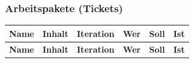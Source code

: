 \documentclass[a4,12pt]{scrartcl}
\begin{document}
\begin{landscape}
\subsubsection{Arbeitspakete (Tickets)}
\begin{longtable}{ p{5.5cm} p{8cm} l l p{1cm} p{1cm} }

\hline 
\multicolumn{1}{p{5.5cm}}{\textbf{Name}} & \multicolumn{1}{p{8cm}}{\textbf{Inhalt}} & \multicolumn{1}{l}{\textbf{Iteration}} & \multicolumn{1}{l}{\textbf{Wer}} & \multicolumn{1}{p{1cm}}{\textbf{Soll}} & \multicolumn{1}{p{1cm}}{\textbf{Ist}} \\ \hline 
\endfirsthead


\hline 
\multicolumn{1}{p{5.5cm}}{\textbf{Name}} & \multicolumn{1}{p{8cm}}{\textbf{Inhalt}} & \multicolumn{1}{l}{\textbf{Iteration}} & \multicolumn{1}{l}{\textbf{Wer}} & \multicolumn{1}{p{1cm}}{\textbf{Soll}} & \multicolumn{1}{p{1cm}}{\textbf{Ist}} \\ \hline 
\endhead



\end{longtable}
\end{landscape}
\end{document}
